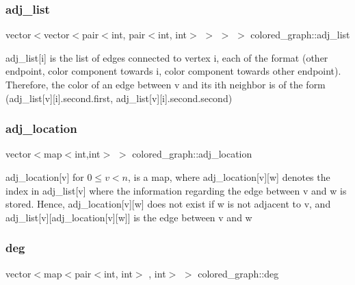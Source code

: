 \subsubsection{\texorpdfstring{adj\+\_\+list}{adj\_list}}
{\footnotesize\ttfamily vector$<$vector$<$pair$<$int, pair$<$int, int$>$ $>$ $>$ $>$ colored\+\_\+graph\+::adj\+\_\+list}



adj\+\_\+list\mbox{[}i\mbox{]} is the list of edges connected to vertex i, each of the format (other endpoint, color component towards i, color component towards other endpoint). Therefore, the color of an edge between v and its ith neighbor is of the form (adj\+\_\+list\mbox{[}v\mbox{]}\mbox{[}i\mbox{]}.second.\+first, adj\+\_\+list\mbox{[}v\mbox{]}\mbox{[}i\mbox{]}.second.\+second) 

\mbox{\label{classcolored__graph_ad657e7e86bee874d19dbc1765e1edaa7}} 
\subsubsection{\texorpdfstring{adj\+\_\+location}{adj\_location}}
{\footnotesize\ttfamily vector$<$map$<$int,int$>$ $>$ colored\+\_\+graph\+::adj\+\_\+location}



adj\+\_\+location\mbox{[}v\mbox{]} for $0 \leq v < n$, is a map, where adj\+\_\+location\mbox{[}v\mbox{]}\mbox{[}w\mbox{]} denotes the index in adj\+\_\+list\mbox{[}v\mbox{]} where the information regarding the edge between v and w is stored. Hence, adj\+\_\+location\mbox{[}v\mbox{]}\mbox{[}w\mbox{]} does not exist if w is not adjacent to v, and adj\+\_\+list\mbox{[}v\mbox{]}\mbox{[}adj\+\_\+location\mbox{[}v\mbox{]}\mbox{[}w\mbox{]}\mbox{]} is the edge between v and w 

\mbox{\label{classcolored__graph_ae3269d35c1b022bc70d195bebd4e1b8a}} 
\subsubsection{\texorpdfstring{deg}{deg}}
{\footnotesize\ttfamily vector$<$map$<$pair$<$int, int$>$ , int$>$ $>$ colored\+\_\+graph\+::deg}




